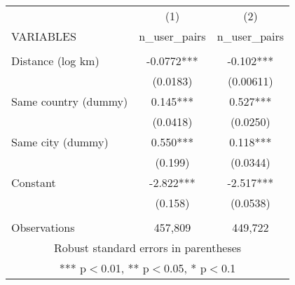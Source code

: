 \begin{tabular}{lcc} \hline
 & (1) & (2) \\
VARIABLES & n\_user\_pairs & n\_user\_pairs \\ \hline
 &  &  \\
Distance (log km) & -0.0772*** & -0.102*** \\
 & (0.0183) & (0.00611) \\
Same country (dummy) & 0.145*** & 0.527*** \\
 & (0.0418) & (0.0250) \\
Same city (dummy) & 0.550*** & 0.118*** \\
 & (0.199) & (0.0344) \\
Constant & -2.822*** & -2.517*** \\
 & (0.158) & (0.0538) \\
 &  &  \\
 Observations & 457,809 & 449,722 \\ \hline
\multicolumn{3}{c}{ Robust standard errors in parentheses} \\
\multicolumn{3}{c}{ *** p$<$0.01, ** p$<$0.05, * p$<$0.1} \\
\end{tabular}
